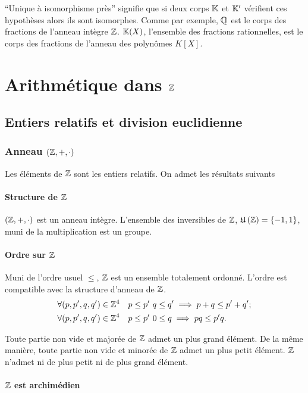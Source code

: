 ``Unique à isomorphisme près'' signifie que si deux corps $\mathbb{K}$ et $\mathbb{K}'$ vérifient ces hypothèses alors ils sont isomorphes. Comme par exemple, $\mathbb{Q}$ est le corps des fractions de l'anneau intègre $\mathbb{Z}$. $\mathbb{K}(X)$, l'ensemble des fractions rationnelles, est le corps des fractions de l'anneau des polynômes $K[X]$.

\section{Arithmétique dans $\mathbb{Z}$}

\subsection{Entiers relatifs et division euclidienne}

\subsubsection{Anneau $(\mathbb{Z},+,\cdot)$}

Les éléments de $\mathbb{Z}$ sont les entiers relatifs. On admet les résultats suivants

\paragraph{Structure de $\mathbb{Z}$}

$(\mathbb{Z},+,\cdot)$ est un anneau intègre. L'ensemble des inversibles de $\mathbb{Z}$, $\mathfrak{U}\left(\mathbb{Z}\right)=\{-1,1\}$, muni de la multiplication est un groupe.

\paragraph{Ordre sur $\mathbb{Z}$}

Muni de l'ordre usuel $\leq$, $\mathbb{Z}$ est un ensemble totalement ordonné. L'ordre est compatible avec la structure d'anneau de $\mathbb{Z}$.
\begin{align}
  \forall (p,p',q,q') \in \mathbb{Z}^4 &\quad p \leq p' \ q \leq q' \implies p+q \leq p'+q';\\
  \forall (p,p',q,q') \in \mathbb{Z}^4 &\quad p \leq p' \ 0 \leq q \implies pq \leq p'q.
\end{align}

Toute partie non vide et majorée de $\mathbb{Z}$ admet un plus grand élément. De la même manière, toute partie non vide et minorée de $\mathbb{Z}$ admet un plus petit élément. $\mathbb{Z}$ n'admet ni de plus petit ni de plus grand élément.

\paragraph{$\mathbb{Z}$ est archimédien}

